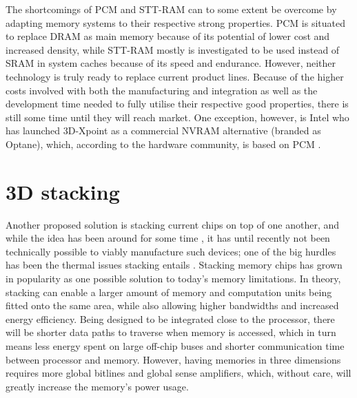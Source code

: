 The shortcomings of PCM and STT-RAM can to some extent be overcome by adapting memory systems to their respective strong properties. PCM is situated to replace DRAM as main memory because of its potential of lower cost and increased density, while STT-RAM mostly is investigated to be used instead of SRAM in system caches because of its speed and endurance. However, neither technology is truly ready to replace current product lines. Because of the higher costs involved with both the manufacturing and integration as well as the development time needed to fully utilise their respective good properties, there is still some time until they will reach market. One exception, however, is Intel who has launched 3D-Xpoint as a commercial NVRAM alternative (branded as Optane), which, according to the hardware community, is based on PCM \cite{jeongdong_2017}.

\section{3D stacking}
Another proposed solution is stacking current chips on top of one another, and while the idea has been around for some time \cite{lee2000three}\cite{jacob2005predicting}\cite{black2006stacking}, it has until recently not been technically possible to viably manufacture such devices; one of the big hurdles has been the thermal issues stacking entails \cite{5074080}. Stacking memory chips has grown in popularity as one possible solution to today's memory limitations. In theory, stacking can enable a larger amount of memory and computation units being fitted onto the same area, while also allowing higher bandwidths and increased energy efficiency\cite{Lee:2016:SMA:2836331.2832911}. Being designed to be integrated close to the processor, there will be shorter data paths to traverse when memory is accessed, which in turn means less energy spent on large off-chip buses and shorter communication time between processor and memory. However, having memories in three dimensions requires more global bitlines and global sense amplifiers, which, without care, will greatly increase the memory's power usage.
\bigskip

